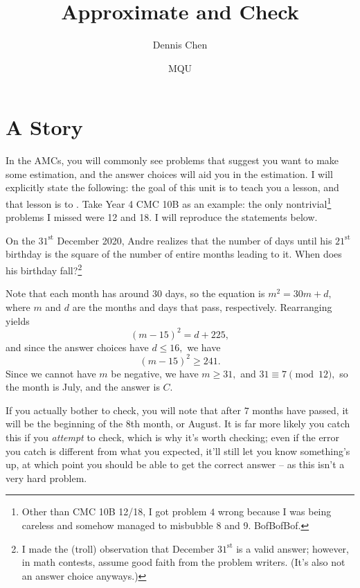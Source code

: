 \documentclass{article}
\title{Approximate and Check}
\author{Dennis Chen}
\date{MQU}
\begin{document}
\maketitle

\section{A Story}

 In the AMCs, you will commonly see problems that suggest you want to make some estimation, and the answer choices will aid you in the estimation. I will explicitly state the following: the goal of this unit is to teach you a lesson, and that lesson is to . Take Year 4 CMC 10B as an example: the only nontrivial\footnote{Other than CMC 10B 12/18, I got problem $4$ wrong because I was being careless and somehow managed to misbubble 8 and 9. BofBofBof.} problems I missed were 12 and 18. I will reproduce the statements below.

\begin{exam}[CMC 10B 2021/12]
On the $31^{\text{st}}$ December 2020, Andre realizes that the number of days until his $21^{\text{st}}$ birthday is the square of the number of entire months leading to it. When does his birthday fall?\footnote{I made the (troll) observation that December $31^{\text{st}}$ is a valid answer; however, in math contests, assume good faith from the problem writers. (It's also not an answer choice anyways.)}

\end{exam}

\begin{sol}[(Bogus)]
Note that each month has around $30$ days, so the equation is $m^2=30m+d,$ where $m$ and $d$ are the months and days that pass, respectively. Rearranging yields
\[(m-15)^2=d+225,\]
and since the answer choices have $d\leq 16,$ we have
\[(m-15)^2\geq 241.\]
Since we cannot have $m$ be negative, we have $m\geq 31,$ and $31\equiv 7\pmod{12},$ so the month is July, and the answer is $C.$
\end{sol}

If you actually bother to check, you will note that after $7$  months have passed, it will be the beginning of the $8$th month, or August. It is far more likely you catch this if you \textit{attempt} to check, which is why it's worth checking; even if the error you catch is different from what you expected, it'll still let you know something's up, at which point you should be able to get the correct answer -- as this isn't a very hard problem.
\end{document}
